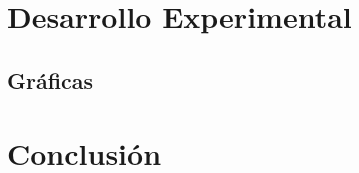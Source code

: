 \documentclass[10pt]{article}
\begin{document}
\section{Desarrollo Experimental}
	\subsection{Gráficas}
\section{Conclusión}


 
 
\end{document}
